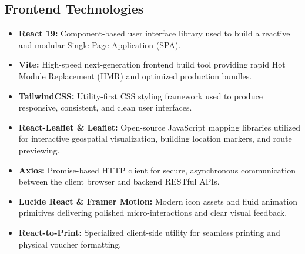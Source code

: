 \documentclass[12pt,a4paper]{article}
\begin{document}
\subsection{Frontend Technologies}
\begin{itemize}[label=--]
    \item \textbf{React 19:} Component-based user interface library used to build a reactive and modular Single Page Application (SPA).
    \item \textbf{Vite:} High-speed next-generation frontend build tool providing rapid Hot Module Replacement (HMR) and optimized production bundles.
    \item \textbf{TailwindCSS:} Utility-first CSS styling framework used to produce responsive, consistent, and clean user interfaces.
    \item \textbf{React-Leaflet \& Leaflet:} Open-source JavaScript mapping libraries utilized for interactive geospatial visualization, building location markers, and route previewing.
    \item \textbf{Axios:} Promise-based HTTP client for secure, asynchronous communication between the client browser and backend RESTful APIs.
    \item \textbf{Lucide React \& Framer Motion:} Modern icon assets and fluid animation primitives delivering polished micro-interactions and clear visual feedback.
    \item \textbf{React-to-Print:} Specialized client-side utility for seamless printing and physical voucher formatting.
\end{itemize}
\end{document}
